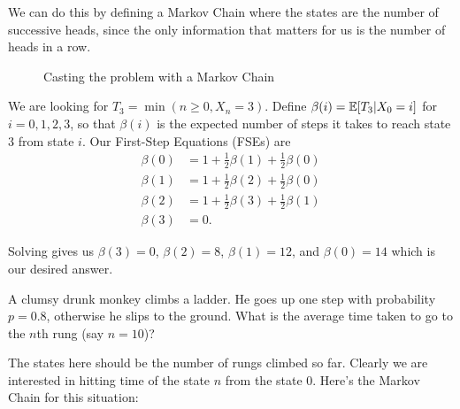 \documentclass[11 pt]{scrartcl}
\begin{document}
    We can do this by defining a Markov Chain where the states are the number of successive heads, since the only information that matters for us is the number of heads in a row. 

    \begin{figure}[!ht]
\begin{center}
\end{center}
\caption{Casting the problem with a Markov Chain}
\end{figure}

We are looking for $T_3 = \min( n\geq 0 , X_n = 3)$. Define $\beta(i) = \mathbb E[T_3 | X_0 = i]$ for $i = 0, 1, 2, 3$, so that $\beta(i)$ is the expected number of steps it takes to reach state $3$ from state $i$. Our First-Step Equations (FSEs) are 
\begin{align*} 
    \beta(0) &= 1 + \frac{1}{2}\beta(1) + \frac{1}{2}\beta(0) \\ 
    \beta(1) &= 1 + \frac{1}{2}\beta(2) + \frac{1}{2}\beta(0) \\ 
    \beta(2) &= 1 + \frac{1}{2}\beta(3) + \frac{1}{2}\beta(1) \\ 
    \beta(3) &= 0.
\end{align*}

Solving gives us $\beta(3) = 0$, $\beta(2) = 8$, $\beta(1) = 12$, and $\beta(0) = 14$ which is our desired answer. 

\begin{example}
    A clumsy drunk monkey climbs a ladder. He goes up one step with probability $p = 0.8$, otherwise he slips to the ground. What is the average time taken to go to the $n$th rung (say $n=10$)?
\end{example}

The states here should be the number of rungs climbed so far. Clearly we are interested in hitting time of the state $n$ from the state $0$. Here's the Markov Chain for this situation: 
\end{document}
